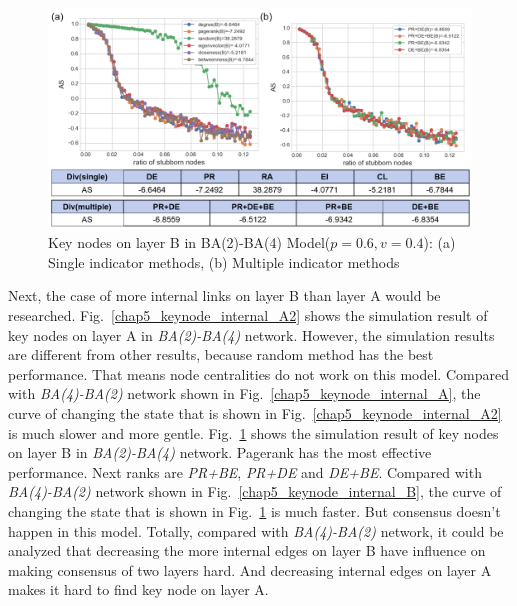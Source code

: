 \begin{figure}[!htb]
	\centering
	\includegraphics[width=\hsize]{figure/chap5_keynode_internal_B2.png}
	\caption{Key nodes on layer B in BA(2)-BA(4) Model($p=0.6, v=0.4$):
		(a) Single indicator methods, (b) Multiple indicator methods}
	\label{chap5_keynode_internal_B2}
\end{figure}
Next, the case of more internal links on layer B than layer A would be researched. 
Fig.~\ref{chap5_keynode_internal_A2} shows the simulation result of key nodes on layer A in \textit{BA(2)-BA(4)} network. However, the simulation results are different from other results, because random method has the best performance. That means node centralities do not work on this model. Compared with \textit{BA(4)-BA(2)} network shown in Fig.~\ref{chap5_keynode_internal_A}, the curve of changing the state that is shown in Fig.~\ref{chap5_keynode_internal_A2}  is much slower and more gentle.
Fig.~\ref{chap5_keynode_internal_B2} shows the simulation result of key nodes on layer B in \textit{BA(2)-BA(4)} network. Pagerank has the most effective performance. Next ranks are \textit{PR+BE}, \textit{PR+DE} and \textit{DE+BE}. Compared with \textit{BA(4)-BA(2)} network shown in Fig.~\ref{chap5_keynode_internal_B}, the curve of changing the state that is shown in Fig.~\ref{chap5_keynode_internal_B2} is much faster. But consensus doesn't happen in this model. 
Totally, compared with \textit{BA(4)-BA(2)} network, it could be analyzed that decreasing the more internal edges on layer B have influence on making consensus of two layers hard. And decreasing internal edges on layer A makes it hard to find key node on layer A.   

